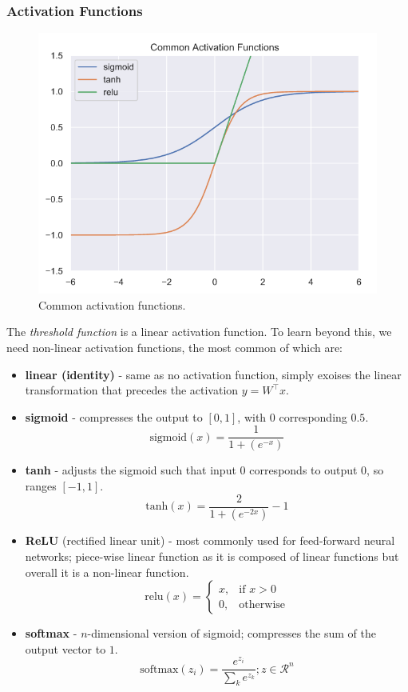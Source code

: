 \documentclass[11pt]{article}
\begin{document}
\subsubsection{Activation Functions}
\begin{figure}[htb!]
  \centering
  \caption{Common activation functions.}
  \includegraphics[scale=0.4]{caf}
\end{figure}
The \textit{threshold function} is a linear activation function.
To learn beyond this, we need non-linear activation functions, the most common of which are:
\begin{itemize}
  \item \textbf{linear (identity)} - same as no activation function, simply exoises the linear transformation that precedes the activation $y = W^\intercal x$.
  \item \textbf{sigmoid} - compresses the output to $[0, 1]$, with $0$ corresponding $0.5$.
    \[
      \text{sigmoid}(x) = \frac{1}{1 + (e^{-x})} 
    \]
  \item \textbf{tanh} - adjusts the sigmoid such that input $0$ corresponds to output $0$, so ranges $[-1, 1]$.
    \[
      \text{tanh}(x) = \frac{2}{1 + (e^{-2x})} - 1 
    \]
  \item \textbf{ReLU} (rectified linear unit) - most commonly used for feed-forward neural networks; piece-wise linear function as it is composed of linear functions but overall it is a non-linear function.
    \[
      \text{relu}(x) =
      \begin{cases}
        x, & \text{if } x > 0 \\
        0, & \text{otherwise}
      \end{cases}
    \]
  \item \textbf{softmax} - $n$-dimensional version of sigmoid; compresses the sum of the output vector to $1$.
    \[
      \text{softmax}(z_i) = \frac{e^{z_i}}{\sum_k e^{z_k}}; z \in \mathcal{R}^n 
    \]
\end{itemize}
\end{document}
